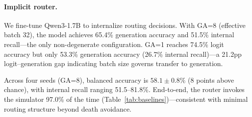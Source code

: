 \paragraph{Implicit router.} We fine-tune Qwen3-1.7B to internalize routing decisions. With GA=8 (effective batch 32), the model achieves 65.4\% generation accuracy and 51.5\% internal recall---the only non-degenerate configuration. GA=1 reaches 74.5\% logit accuracy but only 53.3\% generation accuracy (26.7\% internal recall)---a 21.2pp logit--generation gap indicating batch size governs transfer to generation.

Across four seeds (GA=8), balanced accuracy is $58.1 \pm 0.8\%$ (8 points above chance), with internal recall ranging 51.5--81.8\%. End-to-end, the router invokes the simulator 97.0\% of the time (Table~\ref{tab:baselines})---consistent with minimal routing structure beyond death avoidance.
